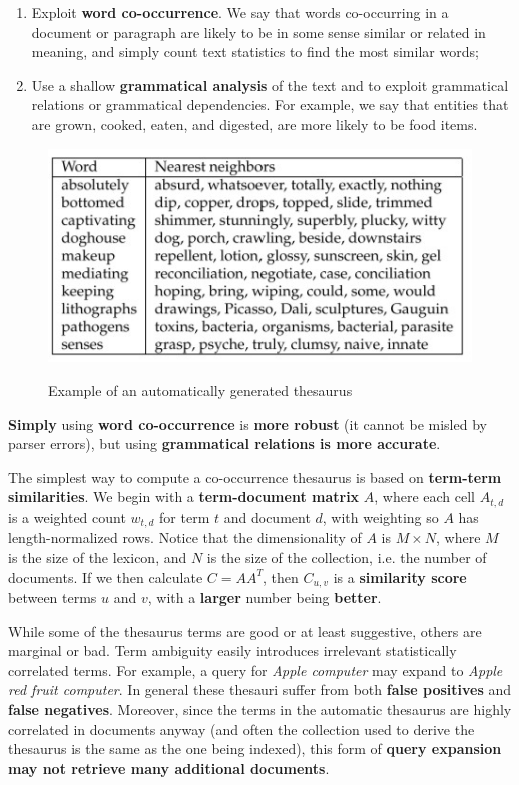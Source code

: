 \begin{enumerate}
    \item Exploit \textbf{word co-occurrence}. We say that words co-occurring in a document or paragraph are likely to be in some sense similar or related in meaning, and simply count text statistics to find the most similar words;
    \item Use a shallow \textbf{grammatical analysis} of the text and to exploit grammatical relations or grammatical dependencies. For example, we say that entities that are grown, cooked, eaten, and digested, are more likely to be food items.
\end{enumerate}

\begin{figure}[h!]
		\centering
		\includegraphics[scale = 2.0]{img/automatic thesaurus.jpg}
		\label{automatic thesaurus}
        \caption{Example of an automatically generated thesaurus}
\end{figure}

\textbf{Simply} using\textbf{ word co-occurrence} is \textbf{more robust} (it cannot be misled by parser errors), but using \textbf{grammatical relations is more accurate}. 

The simplest way to compute a co-occurrence thesaurus is based on \textbf{term-term similarities}. We begin with a \textbf{term-document matrix} $A$, where each cell $A_{t,d}$ is a weighted count $w_{t,d}$ for term $t$ and document $d$, with weighting so $A$ has length-normalized rows. Notice that the dimensionality of $A$ is $M \times N$, where $M$ is the size of the lexicon, and $N$ is the size of the collection, i.e. the number of documents. If we then calculate $C = AA^T$, then $C_{u,v}$ is a \textbf{similarity score} between terms $u$ and $v$, with a \textbf{larger} number being \textbf{better}. 

While some of the thesaurus terms are good or at least suggestive, others are marginal or bad. Term ambiguity easily introduces irrelevant statistically correlated terms. For example, a query for \textit{Apple computer} may expand to \textit{Apple red fruit computer}. In general these thesauri suffer from both \textbf{false positives} and \textbf{false negatives}. Moreover, since the terms in the automatic thesaurus are highly correlated in documents anyway (and often the collection used to derive the thesaurus is the same as the one being indexed), this form of \textbf{query expansion} \textbf{may not retrieve many additional documents}. 


